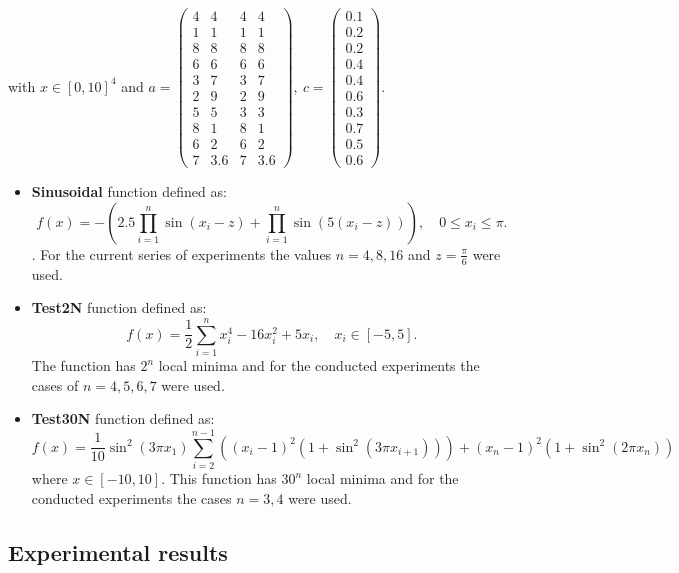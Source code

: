 \documentclass[journal,article,submit,pdftex,moreauthors]{Definitions/mdpi}
\begin{document}
with $x\in[0,10]^{4}$ and $a=\left(\begin{array}{cccc}
4 & 4 & 4 & 4\\
1 & 1 & 1 & 1\\
8 & 8 & 8 & 8\\
6 & 6 & 6 & 6\\
3 & 7 & 3 & 7\\
2 & 9 & 2 & 9\\
5 & 5 & 3 & 3\\
8 & 1 & 8 & 1\\
6 & 2 & 6 & 2\\
7 & 3.6 & 7 & 3.6
\end{array}\right),\ c=\left(\begin{array}{c}
0.1\\
0.2\\
0.2\\
0.4\\
0.4\\
0.6\\
0.3\\
0.7\\
0.5\\
0.6
\end{array}\right)$. 
\begin{itemize}
\item \textbf{Sinusoidal} function defined as:
\[
f(x)=-\left(2.5\prod_{i=1}^{n}\sin\left(x_{i}-z\right)+\prod_{i=1}^{n}\sin\left(5\left(x_{i}-z\right)\right)\right),\quad0\le x_{i}\le\pi.
\]. For the current series of experiments the values  $n=4,8,16$ and $z=\frac{\pi}{6}$ were used.
\item \textbf{Test2N} function defined as:
\[
f(x)=\frac{1}{2}\sum_{i=1}^{n}x_{i}^{4}-16x_{i}^{2}+5x_{i},\quad x_{i}\in[-5,5].
\]
The function has $2^{n}$ local minima and for the conducted experiments the cases of  $n=4,5,6,7$ were used.
\item \textbf{Test30N} function defined as:
\[
f(x)=\frac{1}{10}\sin^{2}\left(3\pi x_{1}\right)\sum_{i=2}^{n-1}\left(\left(x_{i}-1\right)^{2}\left(1+\sin^{2}\left(3\pi x_{i+1}\right)\right)\right)+\left(x_{n}-1\right)^{2}\left(1+\sin^{2}\left(2\pi x_{n}\right)\right)
\]
where $x\in[-10,10]$. This function has $30^{n}$ local  minima  and  for the conducted experiments the cases  $n=3,4$ were used.

\end{itemize}

\subsection{Experimental results}
\end{document}
